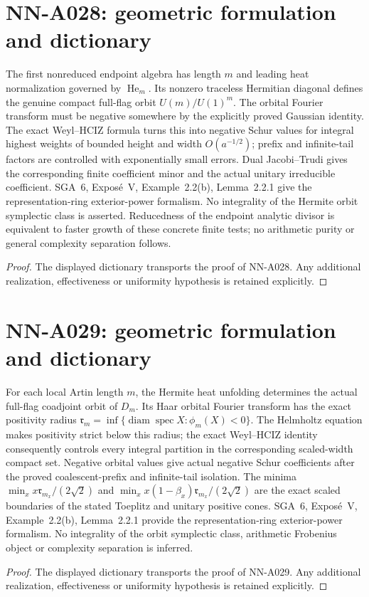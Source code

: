 \section{NN-A028: geometric formulation and dictionary}
\begin{geometricstatement}[NN-A028]
The first nonreduced endpoint algebra has length $m$ and leading heat normalization governed by $\operatorname{He}_m$. Its nonzero traceless Hermitian diagonal defines the genuine compact full-flag orbit $U(m)/U(1)^m$. The orbital Fourier transform must be negative somewhere by the explicitly proved Gaussian identity. The exact Weyl--HCIZ formula turns this into negative Schur values for integral highest weights of bounded height and width $O(a^{-1/2})$; prefix and infinite-tail factors are controlled with exponentially small errors. Dual Jacobi--Trudi gives the corresponding finite coefficient minor and the actual unitary irreducible coefficient. SGA~6, Expos\'e~V, Example~2.2(b), Lemma~2.2.1 give the representation-ring exterior-power formalism. No integrality of the Hermite orbit symplectic class is asserted. Reducedness of the endpoint analytic divisor is equivalent to faster growth of these concrete finite tests; no arithmetic purity or general complexity separation follows.
\end{geometricstatement}
\begin{proof} The displayed dictionary transports the proof of NN-A028. Any additional realization, effectiveness or uniformity hypothesis is retained explicitly.\end{proof}


\section{NN-A029: geometric formulation and dictionary}
\begin{geometricstatement}[NN-A029]
For each local Artin length $m$, the Hermite heat unfolding determines the actual full-flag coadjoint orbit of $D_m$. Its Haar orbital Fourier transform has the exact positivity radius $\mathfrak r_m=\inf\{\operatorname{diam}\operatorname{spec}X:\phi_m(X)<0\}$. The Helmholtz equation makes positivity strict below this radius; the exact Weyl--HCIZ identity consequently controls every integral partition in the corresponding scaled-width compact set. Negative orbital values give actual negative Schur coefficients after the proved coalescent-prefix and infinite-tail isolation. The minima $\min_x x\mathfrak r_{m_x}/(2\sqrt2)$ and $\min_x x(1-\beta_x)\mathfrak r_{m_x}/(2\sqrt2)$ are the exact scaled boundaries of the stated Toeplitz and unitary positive cones. SGA~6, Expos\'e~V, Example~2.2(b), Lemma~2.2.1 provide the representation-ring exterior-power formalism. No integrality of the orbit symplectic class, arithmetic Frobenius object or complexity separation is inferred.
\end{geometricstatement}
\begin{proof} The displayed dictionary transports the proof of NN-A029. Any additional realization, effectiveness or uniformity hypothesis is retained explicitly.\end{proof}


